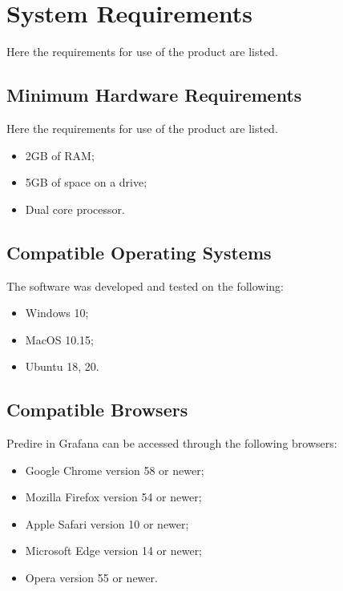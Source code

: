 \section{System Requirements}
Here the requirements for use of the product are listed.

\subsection{Minimum Hardware Requirements}
Here the requirements for use of the product are listed.
\begin{itemize}
	\item 2GB of RAM;
	\item 5GB of space on a drive;
	\item Dual core processor.	
\end{itemize}

\subsection{Compatible Operating Systems}
The software was developed and tested on the following:
\begin{itemize}
	\item Windows 10;
	\item MacOS 10.15;
	\item Ubuntu 18, 20.
\end{itemize}

\subsection{Compatible Browsers}
Predire in Grafana can be accessed through the following browsers:
\begin{itemize}
	\item Google Chrome version 58 or newer;
	\item Mozilla Firefox version 54 or newer;
	\item Apple Safari version 10 or newer;
	\item Microsoft Edge version 14 or newer;
	\item Opera version 55 or newer.
\end{itemize}



